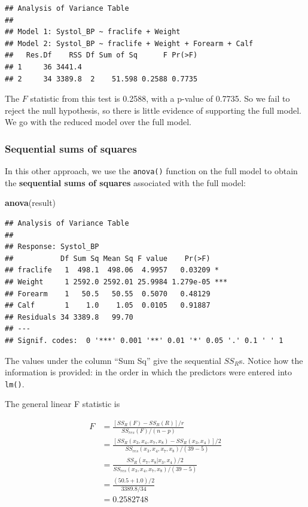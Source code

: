 \documentclass[
]{book}
\newenvironment{Shaded}{\begin{snugshade}}{\end{snugshade}}
\newcommand{\FunctionTok}[1]{\textcolor[rgb]{0.13,0.29,0.53}{\textbf{#1}}}
\newcommand{\NormalTok}[1]{#1}
\begin{document}
\begin{verbatim}
## Analysis of Variance Table
## 
## Model 1: Systol_BP ~ fraclife + Weight
## Model 2: Systol_BP ~ fraclife + Weight + Forearm + Calf
##   Res.Df    RSS Df Sum of Sq      F Pr(>F)
## 1     36 3441.4                           
## 2     34 3389.8  2    51.598 0.2588 0.7735
\end{verbatim}

The \(F\) statistic from this test is 0.2588, with a p-value of 0.7735. So we fail to reject the null hypothesis, so there is little evidence of supporting the full model. We go with the reduced model over the full model.

\hypertarget{sequential-sums-of-squares}{%
\subsubsection*{Sequential sums of squares}\label{sequential-sums-of-squares}}

In this other approach, we use the \texttt{anova()} function on the full model to obtain the \textbf{sequential sums of squares} associated with the full model:

\begin{Shaded}
\begin{Highlighting}[]
\FunctionTok{anova}\NormalTok{(result)}
\end{Highlighting}
\end{Shaded}

\begin{verbatim}
## Analysis of Variance Table
## 
## Response: Systol_BP
##           Df Sum Sq Mean Sq F value    Pr(>F)    
## fraclife   1  498.1  498.06  4.9957   0.03209 *  
## Weight     1 2592.0 2592.01 25.9984 1.279e-05 ***
## Forearm    1   50.5   50.55  0.5070   0.48129    
## Calf       1    1.0    1.05  0.0105   0.91887    
## Residuals 34 3389.8   99.70                      
## ---
## Signif. codes:  0 '***' 0.001 '**' 0.01 '*' 0.05 '.' 0.1 ' ' 1
\end{verbatim}

The values under the column ``Sum Sq'' give the sequential \(SS_{R}\)s. Notice how the information is provided: in the order in which the predictors were entered into \texttt{lm()}.

The general linear F statistic is

\begin{align}
F &= \frac{[SS_R(F) - SS_R(R)]/r}{SS_{res}(F)/(n-p)} \nonumber \\
  &= \frac{[SS_R(x_3, x_4, x_7, x_8) - SS_R(x_3, x_4)]/2}{SS_{res}(x_3, x_4, x_7, x_8)/(39-5)} \nonumber \\
  &= \frac{SS_R(x_7, x_8 | x_3, x_4)/2}{SS_{res}(x_3, x_4, x_7, x_8)/(39-5)} \nonumber \\
  &= \frac{(50.5+1.0)/2}{3389.8/34} \nonumber \\
  &= 0.2582748
\end{align}
\end{document}
